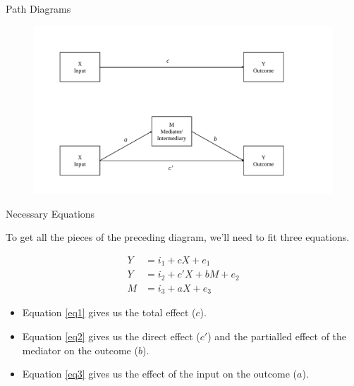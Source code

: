 \documentclass{beamer}
\newcommand{\vb}[0]{\vspace{6pt}}
\begin{document}
\begin{frame}{Path Diagrams}

\begin{figure}
\includegraphics[width=\textwidth]{figures/simpleMediationPathDiagram.pdf}
\end{figure}

\end{frame}


\begin{frame}{Necessary Equations}

  To get all the pieces of the preceding diagram, we'll need to fit
  three equations.

\begin{align}
Y &= i_1 + cX + e_1 \label{eq1}\\
Y &= i_2 + c'X + bM + e_2 \label{eq2}\\
M &= i_3 + aX + e_3 \label{eq3}
\end{align}

\begin{itemize}
\item Equation \ref{eq1} gives us the total effect ($c$).
  \vb
\item Equation \ref{eq2} gives us the direct effect ($c'$) and the
  partialled effect of the mediator on the outcome ($b$).
  \vb
\item Equation \ref{eq3} gives us the effect of the input on the
  outcome ($a$).
\end{itemize}

\end{frame}
\end{document}
